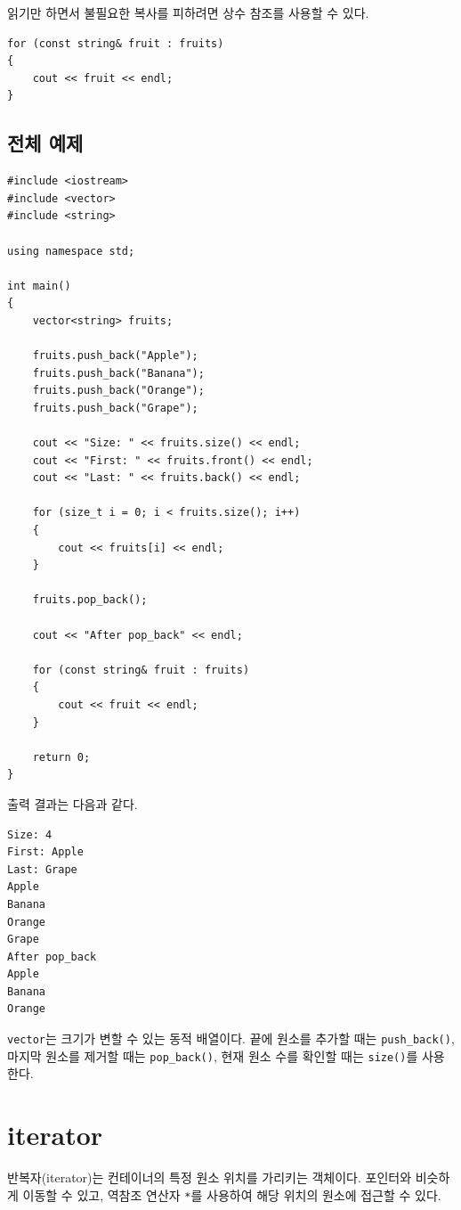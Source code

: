 \documentclass[11pt,a4paper]{article}
\begin{document}
읽기만 하면서 불필요한 복사를 피하려면 상수 참조를 사용할 수 있다.

\begin{lstlisting}
for (const string& fruit : fruits)
{
    cout << fruit << endl;
}
\end{lstlisting}

\subsection{전체 예제}
\begin{lstlisting}
#include <iostream>
#include <vector>
#include <string>

using namespace std;

int main()
{
    vector<string> fruits;

    fruits.push_back("Apple");
    fruits.push_back("Banana");
    fruits.push_back("Orange");
    fruits.push_back("Grape");

    cout << "Size: " << fruits.size() << endl;
    cout << "First: " << fruits.front() << endl;
    cout << "Last: " << fruits.back() << endl;

    for (size_t i = 0; i < fruits.size(); i++)
    {
        cout << fruits[i] << endl;
    }

    fruits.pop_back();

    cout << "After pop_back" << endl;

    for (const string& fruit : fruits)
    {
        cout << fruit << endl;
    }

    return 0;
}
\end{lstlisting}

출력 결과는 다음과 같다.

\begin{verbatim}
Size: 4
First: Apple
Last: Grape
Apple
Banana
Orange
Grape
After pop_back
Apple
Banana
Orange
\end{verbatim}

\begin{importantbox}
\texttt{vector}는 크기가 변할 수 있는 동적 배열이다. 끝에 원소를 추가할 때는 \texttt{push\_back()}, 마지막 원소를 제거할 때는 \texttt{pop\_back()}, 현재 원소 수를 확인할 때는 \texttt{size()}를 사용한다.
\end{importantbox}

\section{iterator}
반복자(iterator)는 컨테이너의 특정 원소 위치를 가리키는 객체이다. 포인터와 비슷하게 이동할 수 있고, 역참조 연산자 \texttt{*}를 사용하여 해당 위치의 원소에 접근할 수 있다.
\end{document}
